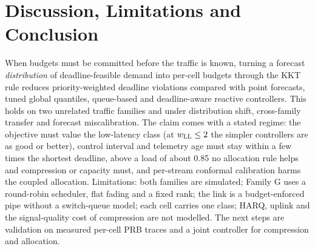 \documentclass[conference]{IEEEtran}
\begin{document}
\section{Discussion, Limitations and Conclusion}
\label{sec:limits}
When budgets must be committed before the traffic is known, turning a forecast \emph{distribution} of deadline-feasible demand into per-cell budgets through the KKT rule reduces priority-weighted deadline violations compared with point forecasts, tuned global quantiles, queue-based and deadline-aware reactive controllers. This holds on two unrelated traffic families and under distribution shift, cross-family transfer and forecast miscalibration. The claim comes with a stated regime: the objective must value the low-latency class (at $w_{\rm LL} \le 2$ the simpler controllers are as good or better), control interval and telemetry age must stay within a few times the shortest deadline, above a load of about 0.85 no allocation rule helps and compression or capacity must, and per-stream conformal calibration harms the coupled allocation. Limitations: both families are simulated; Family G uses a round-robin scheduler, flat fading and a fixed rank; the link is a budget-enforced pipe without a switch-queue model; each cell carries one class; HARQ, uplink and the signal-quality cost of compression are not modelled. The next steps are validation on measured per-cell PRB traces and a joint controller for compression and allocation.
\end{document}
